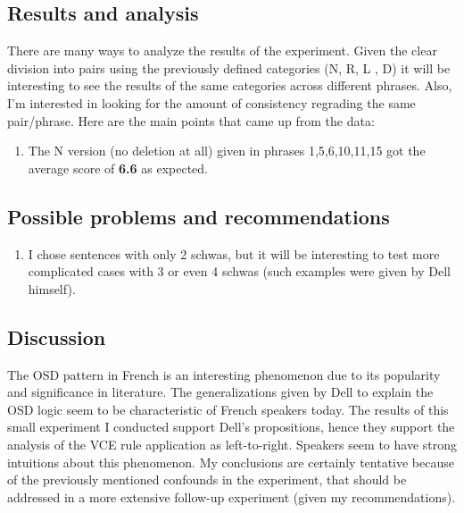 \documentclass{article}
\begin{document}
\subsection{Results and analysis}
There are many ways to analyze the results of the experiment. Given the clear division into pairs using the previously defined categories (N, R, L , D) it will be interesting to see the results of the same categories across different phrases.  Also,  I'm interested in looking for the amount of consistency regrading the same pair/phrase.  Here are the main points that came up from the data:
\begin{enumerate}
  \item The N version (no deletion at all) given in phrases 1,5,6,10,11,15 got the average score of \textbf{6.6} as expected.
\end{enumerate}

\subsection{Possible problems and recommendations}
\begin{enumerate}
  \item I chose sentences with only 2 schwas, but it will be interesting to test more complicated cases with 3 or even 4 schwas (such examples were given by Dell himself).
\end{enumerate}

\subsection{Discussion}
The OSD pattern in French is an interesting phenomenon due to its popularity and significance in literature. The generalizations given by Dell to explain the OSD logic seem to be characteristic of French speakers today. The results of this small experiment I conducted support Dell's propositions, hence they support the analysis of the VCE rule application as left-to-right. Speakers seem to have strong intuitions about this phenomenon.
My conclusions are certainly tentative because of the previously mentioned confounds in the experiment,  that should be addressed in a more extensive follow-up experiment (given my recommendations).

\clearpage
\fancyhead{} %
\end{document}
